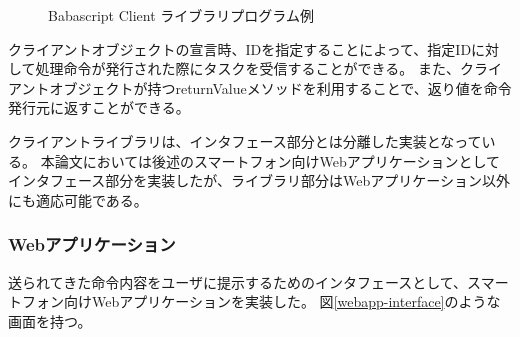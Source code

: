 \documentclass[twoside]{wiss}
\begin{document}
\begin{figure}[!h]  
  \centering
  \caption{Babascript Client ライブラリプログラム例}
  \label{client_library}
\end{figure}

クライアントオブジェクトの宣言時、IDを指定することによって、指定IDに対して処理命令が発行された際にタスクを受信することができる。
また、クライアントオブジェクトが持つreturnValueメソッドを利用することで、返り値を命令発行元に返すことができる。

クライアントライブラリは、インタフェース部分とは分離した実装となっている。
本論文においては後述のスマートフォン向けWebアプリケーションとしてインタフェース部分を実装したが、ライブラリ部分はWebアプリケーション以外にも適応可能である。

\subsubsection{Webアプリケーション}

送られてきた命令内容をユーザに提示するためのインタフェースとして、スマートフォン向けWebアプリケーションを実装した。
図\ref{webapp-interface}のような画面を持つ。
\end{document}
